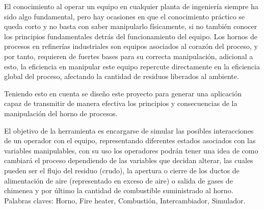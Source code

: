 \documentclass[pregrado]{tesis-usb}
\begin{document}
\frontmatter
\maketitle


\begin{resumen}
     El conocimiento al operar un equipo en cualquier planta de ingeniería siempre ha sido algo fundamental, pero hay ocasiones en que el conocimiento práctico se queda corto y no basta con saber manipularlo físicamente, si no también conocer los principios fundamentales detrás del funcionamiento del equipo. Los hornos de procesos en refinerías industriales son equipos asociados al corazón del proceso, y por tanto, requieren de fuertes bases para su correcta manipulación, adicional a esto, la eficiencia en manipular este equipo repercute directamente en la eficiencia global del proceso, afectando la cantidad de residuos liberados al ambiente.
     
     Teniendo esto en cuenta se diseño este proyecto para generar una aplicación capaz de transmitir de manera efectiva los principios y consecuencias de la manipulación del horno de procesos. 
     
     El objetivo de la herramienta es encargarse de simular las posibles interacciones de un operador con el equipo, representando diferentes estados asociados con las variables manipulables, con su uso los operadores podrán tener una idea de como cambiará el proceso dependiendo de las variables que decidan alterar, las cuales pueden ser el flujo del residuo (crudo), la apertura o cierre de los ductos de alimentación de aire (representado en exceso de aire) o salida de gases de chimenea y por último la cantidad de combustible suministrado al horno. \\
     
     Palabras claves: Horno, Fire heater, Combustión, Intercambiador, Simulador.
\end{resumen}
\tableofcontents
\listoffigures
\listoftables
\useacronyms


\mainmatter






%
%

\nocite{*}

\appendix


\end{document}
